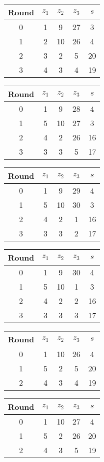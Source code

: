 \begin{multicols}{2}
\begin{tabular}{c | c | c | c | c }
Round & $z_1$ & $z_2$ & $z_3$ & $s$ \\
\hline
0 & 1 & 9 & 27 & 3 \\
1 & 2 & 10 & 26 & 4 \\
2 & 3 & 2 & 5 & 20 \\
3 & 4 & 3 & 4 & 19
\end{tabular}

\begin{tabular}{c | c | c | c | c }
Round & $z_1$ & $z_2$ & $z_3$ & $s$ \\
\hline
0 & 1 & 9 & 28 & 4 \\
1 & 5 & 10 & 27 & 3 \\
2 & 4 & 2 & 26 & 16 \\
3 & 3 & 3 & 5 & 17
\end{tabular}

\begin{tabular}{c | c | c | c | c }
Round & $z_1$ & $z_2$ & $z_3$ & $s$ \\
\hline
0 & 1 & 9 & 29 & 4 \\
1 & 5 & 10 & 30 & 3 \\
2 & 4 & 2 & 1 & 16 \\
3 & 3 & 3 & 2 & 17
\end{tabular}

\begin{tabular}{c | c | c | c | c }
Round & $z_1$ & $z_2$ & $z_3$ & $s$ \\
\hline
0 & 1 & 9 & 30 & 4 \\
1 & 5 & 10 & 1 & 3 \\
2 & 4 & 2 & 2 & 16 \\
3 & 3 & 3 & 3 & 17
\end{tabular}

\begin{tabular}{c | c | c | c | c }
Round & $z_1$ & $z_2$ & $z_3$ & $s$ \\
\hline
0 & 1 & 10 & 26 & 4 \\
1 & 5 & 2 & 5 & 20 \\
2 & 4 & 3 & 4 & 19
\end{tabular}


\begin{tabular}{c | c | c | c | c }
Round & $z_1$ & $z_2$ & $z_3$ & $s$ \\
\hline
0 & 1 & 10 & 27 & 4 \\
1 & 5 & 2 & 26 & 20 \\
2 & 4 & 3 & 5 & 19
\end{tabular}



\end{multicols}
